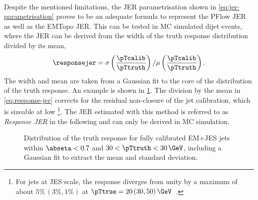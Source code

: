 \paragraph{}
Despite the mentioned limitations, the JER parametrisation shown in \cref{eq:jer-parametrisation} proves to be an adequate formula to represent the PFlow JER as well as the EMTopo JER.
This can be tested in MC simulated dijet events, where the JER can be derived from the width of the truth response distribution divided by its mean,
\begin{equation}
    \label{eq:response-jer}
    \responsejer = \sigma \left( \frac{\pTcalib}{\pTtruth} \right) / \mu \left( \frac{\pTcalib}{\pTtruth} \right).
\end{equation}
The width and mean are taken from a Gaussian fit to the core of the distribution of the truth response. An example is shown in \cref{fig:truth-response}. The division by the mean in \cref{eq:response-jer} corrects for the residual non-closure of the jet calibration, which is sizeable at low \pT\footnote{For jets at JES scale, the response diverges from unity by a maximum of about $5\%\,(3\%, 1\%)$ at $\pTtrue = 20\,(30, 50)\,\GeV$~\cite{JETM-2018-05}.}. 
The JER estimated with this method is referred to as \emph{Response JER} in the following and can only be derived in MC simulation.

\begin{figure}[t]
    \caption{Distribution of the truth response for fully calibrated EM+JES jets within $\abseta < 0.7$ and $30 < \pTtruth < 30\,\GeV$, including a Gaussian fit to extract the mean and standard deviation.}
    \label{fig:truth-response}
\end{figure}

